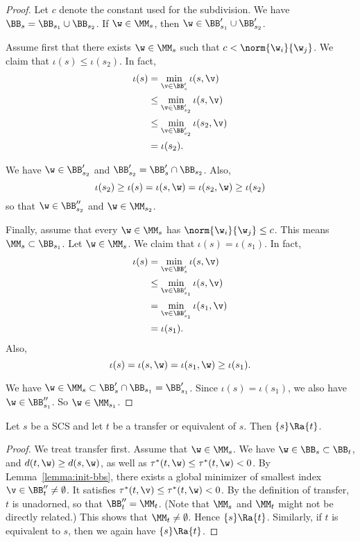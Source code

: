 \begin{proof}
Let $c$ denote the constant used for the subdivision.
We have $\BB_s =
\BB_{s_1}\cup \BB_{s_2}$.  If $\w\in \MM_s$, then
$\w\in \BB'_{s_1}\cup\BB'_{s_2}$.

Assume first that there exists $\w\in \MM_s$ such that $c < \norm{\w_i}{\w_j}$.
We claim that $\iota(s) \le \iota(s_2)$.  In fact,
\begin{align*}
\iota(s) &=\min_{\v\in \BB'_s} \iota(s,\v)\\
&\le \min_{\v\in \BB'_{s_2}} \iota(s,\v) \\
&\le \min_{\v\in \BB'_{s_2}} \iota(s_2,\v) \\
&=\iota(s_2).
\end{align*}

We have $\w\in\BB'_{s_2}$ and $\BB'_{s_2} = \BB'_s \cap \BB_{s_2}$.
Also,
\[
\iota(s_2)\ge \iota(s) = \iota(s,\w) = \iota(s_2,\w) \ge \iota(s_2)
\]
so that $\w\in \BB''_{s_2}$ and $\w\in \MM_{s_2}$.

Finally, assume that every $\w\in\MM_s$ has $\norm{\w_i}{\w_j}\le c$.  This
means $\MM_s\subset \BB_{s_1}$. Let $\w\in\MM_s$.
We claim that $\iota(s) = \iota(s_1)$.  In fact,
\begin{align*}
\iota(s) &= \min_{\v\in \BB'_s} \iota(s,\v) \\
   &\le \min_{\v\in\BB'_{s_1}}\iota(s,\v)\\
   &=\min_{\v\in \BB'_{s_1}}\iota(s_1,\v)\\
   &=\iota(s_1).
\end{align*}
Also, 
\[
\iota(s) = \iota(s,\w) = \iota(s_1,\w) \ge \iota(s_1).
\]

We have $\w\in\MM_s\subset \BB'_s\cap \BB_{s_1} = \BB'_{s_1}$.
Since $\iota(s)=\iota(s_1)$, we also have $\w\in \BB''_{s_1}$.
So $\w\in \MM_{s_1}$.
\end{proof}

\begin{lemma}  
Let $s$ be a SCS and let
 $t$ be a transfer or equivalent of $s$.  
Then  $\{s\}\Ra\{t\}$.
\end{lemma}

\begin{proof}
We treat transfer first.
Assume that $\w\in \MM_s$.
We have $\w\in \BB_s\subset\BB_t$, and $d(t,\w) \ge d(s,\w)$,
as well as $\tau^*(t,\w)\le\tau^*(t,\w)< 0$.   By Lemma~\ref{lemma:init-bbs}, there
exists a global minimizer of smallest index
$\v\in\BB''_t\ne\emptyset$.  It satisfies
$\tau^*(t,\v)\le\tau^*(t,\w)< 0$.  By the definition of transfer,
$t$
is unadorned, so that $\BB''_t=\MM_t$.  (Note that $\MM_s$ and
$\MM_t$
might not be directly related.)  This shows that
$\MM_t\ne\emptyset$.
Hence $\{s\}\Ra\{t\}$.  Similarly, if $t$ is equivalent to $s$,
then we again have $\{s\}\Ra\{t\}$.
\end{proof}

